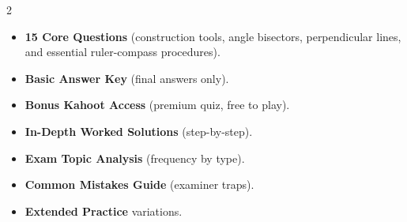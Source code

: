 \documentclass[11pt,a4paper]{article}
\newcommand{\FullReleaseDate}{April 30, 2026}
\begin{document}
\vspace{8pt}

\begin{multicols}{2}
  \begin{tcolorbox}[card, title=\sffamily\bfseries\textcolor{white}{\faHandPointDown\ TODAY (Simplified Version)}, colbacktitle=mainblue, boxed title style={sharp corners, boxrule=0pt}]
    \begin{itemize}[leftmargin=1.2em, itemsep=2pt]
      \item \small \textbf{15 Core Questions} (construction tools, angle bisectors, perpendicular lines, and essential ruler-compass procedures).
      \item \small \textbf{Basic Answer Key} (final answers only).
      \item \small \textbf{Bonus Kahoot Access} (premium quiz, free to play).
    \end{itemize}
  \end{tcolorbox}

  \columnbreak

  \begin{tcolorbox}[card, title=\sffamily\bfseries\textcolor{white}{\faRocket\ ON \FullReleaseDate\ (Full Upgrade)}, colbacktitle=mainblue, boxed title style={sharp corners, boxrule=0pt}]
    \begin{itemize}[leftmargin=1.2em, itemsep=2pt]
      \item \small \textbf{In-Depth Worked Solutions} (step-by-step).
      \item \small \textbf{Exam Topic Analysis} (frequency by type).
      \item \small \textbf{Common Mistakes Guide} (examiner traps).
      \item \small \textbf{Extended Practice} variations.
    \end{itemize}
  \end{tcolorbox}
\end{multicols}
\end{document}
